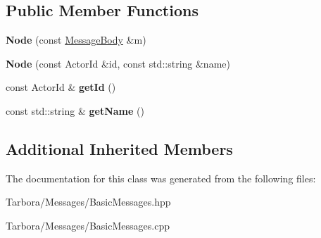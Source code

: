 \subsection*{Public Member Functions}
\begin{DoxyCompactItemize}
\item 
\mbox{\label{classTarbora_1_1Message_1_1Node_aee394097c9e4ebf44d8a922d8671013b}} 
{\bfseries Node} (const \hyperlink{classTarbora_1_1MessageBody}{Message\+Body} \&m)
\item 
\mbox{\label{classTarbora_1_1Message_1_1Node_afb7d0daa78b6b57db7db8874ebc0aa8a}} 
{\bfseries Node} (const Actor\+Id \&id, const std\+::string \&name)
\item 
\mbox{\label{classTarbora_1_1Message_1_1Node_abc1f4a30c1e6c5c17e0661d6a50ca9b0}} 
const Actor\+Id \& {\bfseries get\+Id} ()
\item 
\mbox{\label{classTarbora_1_1Message_1_1Node_a6adccabd53a7e80dd8c7912af7d8523d}} 
const std\+::string \& {\bfseries get\+Name} ()
\end{DoxyCompactItemize}
\subsection*{Additional Inherited Members}


The documentation for this class was generated from the following files\+:\begin{DoxyCompactItemize}
\item 
Tarbora/\+Messages/Basic\+Messages.\+hpp\item 
Tarbora/\+Messages/Basic\+Messages.\+cpp\end{DoxyCompactItemize}
